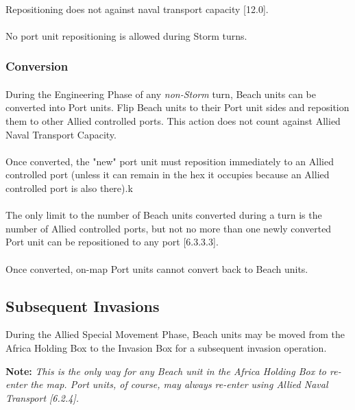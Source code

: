 \paragraph{}
Repositioning does not against naval transport capacity [12.0].

\paragraph{}
No port unit repositioning is allowed during Storm turns.

\subsubsection{Conversion}

\paragraph{}
During the Engineering Phase of any \textit{non-Storm} turn, Beach units can be converted into Port units. Flip Beach units to their Port unit sides and reposition them to other Allied controlled ports. This action does not count against Allied Naval Transport Capacity.

\paragraph{}
Once converted, the "new" port unit must reposition immediately to an Allied controlled port (unless it can remain in the hex it occupies because an Allied controlled port is also there).k

\paragraph{}
The only limit to the number of Beach units converted during a turn is the number of Allied controlled ports, but not no more than one newly converted Port unit can be repositioned to any port [6.3.3.3].

\paragraph{}
Once converted, on-map Port units cannot convert back to Beach units.

\subsection{Subsequent Invasions}
During the Allied Special Movement Phase, Beach units may be moved from the Africa Holding Box to the Invasion Box for a subsequent invasion operation.

\textbf{Note:} \textit{This is the only way for any Beach unit in the Africa Holding Box to re-enter the map. Port units, of course, may always re-enter using Allied Naval Transport [6.2.4].}